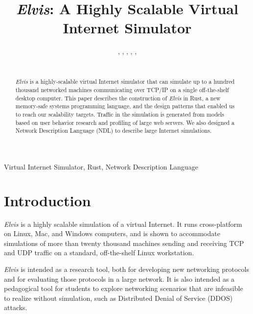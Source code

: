 \documentclass[journal]{IEEEtran} %
\newcommand{\elvis}{\textit{Elvis}}
\begin{document}
\title{\elvis{}: A Highly Scalable Virtual Internet Simulator\\}

\author{%
    , 
    ,
    ,
    ,
    ,
    \\%
    \\%
}

\maketitle

\begin{abstract}
\elvis{} is a highly-scalable virtual Internet simulator that can simulate up to a hundred thousand networked machines communicating over TCP/IP on a single off-the-shelf desktop computer. This paper describes the construction of \elvis{} in Rust, a new memory-safe systems programming language, and the design patterns that enabled us to reach our scalability targets.  Traffic in the simulation is generated from models based on user behavior research and profiling of large web servers. We also designed a Network Description Language (NDL) to describe large Internet simulations.
\end{abstract}

\begin{IEEEkeywords}
    Virtual Internet Simulator, Rust, Network Description Language
\end{IEEEkeywords}

\section{Introduction}
\elvis{} is a highly scalable simulation of a virtual Internet. It runs cross-platform on Linux, Mac, and Windows computers, and is shown to accommodate simulations of more than twenty thousand machines sending and receiving TCP and UDP traffic on a standard, off-the-shelf Linux workstation.

\elvis{} is intended as a research tool, both for developing new networking protocols and for evaluating those protocols in a large network. It is also intended as a pedagogical tool for students to explore networking scenarios that are infeasible to realize without simulation, such as Distributed Denial of Service (DDOS) attacks.
\end{document}
